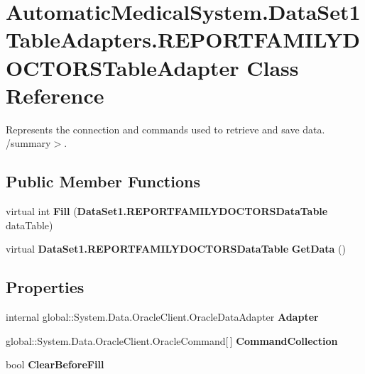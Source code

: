 \section{AutomaticMedicalSystem.DataSet1TableAdapters.REPORTFAMILYDOCTORSTableAdapter Class Reference}
\label{class_automatic_medical_system_1_1_data_set1_table_adapters_1_1_r_e_p_o_r_t_f_a_m_i_l_y_d_o_c_t_o_r_s_table_adapter}
Represents the connection and commands used to retrieve and save data. /summary$>$.  


\subsection*{Public Member Functions}
\begin{CompactItemize}
\item 
virtual int \textbf{Fill} ({\bf DataSet1.REPORTFAMILYDOCTORSDataTable} dataTable)\label{class_automatic_medical_system_1_1_data_set1_table_adapters_1_1_r_e_p_o_r_t_f_a_m_i_l_y_d_o_c_t_o_r_s_table_adapter_90bcd985f647bc0a6c748d2cb99ce5d4}

\item 
virtual {\bf DataSet1.REPORTFAMILYDOCTORSDataTable} \textbf{GetData} ()\label{class_automatic_medical_system_1_1_data_set1_table_adapters_1_1_r_e_p_o_r_t_f_a_m_i_l_y_d_o_c_t_o_r_s_table_adapter_ddc0ac49414a0eb94d3374b21d27b368}

\end{CompactItemize}
\subsection*{Properties}
\begin{CompactItemize}
\item 
internal global::System.Data.OracleClient.OracleDataAdapter \textbf{Adapter}\hspace{0.3cm}{\tt  [get]}\label{class_automatic_medical_system_1_1_data_set1_table_adapters_1_1_r_e_p_o_r_t_f_a_m_i_l_y_d_o_c_t_o_r_s_table_adapter_cd49923447c0f1602d17de933db0900b}

\item 
global::System.Data.OracleClient.OracleCommand[$\,$] \textbf{CommandCollection}\hspace{0.3cm}{\tt  [get]}\label{class_automatic_medical_system_1_1_data_set1_table_adapters_1_1_r_e_p_o_r_t_f_a_m_i_l_y_d_o_c_t_o_r_s_table_adapter_ddd0bf51d7311dc8c1c0d519c867e305}

\item 
bool \textbf{ClearBeforeFill}\hspace{0.3cm}{\tt  [get, set]}\label{class_automatic_medical_system_1_1_data_set1_table_adapters_1_1_r_e_p_o_r_t_f_a_m_i_l_y_d_o_c_t_o_r_s_table_adapter_4c055bafb39b1a4d14d38638068d3d7b}

\end{CompactItemize}


